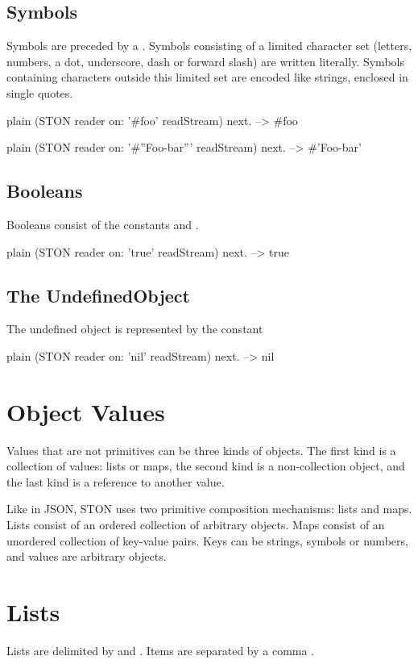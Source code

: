\documentclass[10pt,twoside,english]{_support/latex/sbabook/sbabook}
\begin{document}
\subsection{Symbols}
Symbols are preceded by a \textcode{\#}.
Symbols consisting of a limited character set (letters, numbers, a dot, underscore, dash or forward slash) are written literally. Symbols containing characters
outside this limited set are encoded like strings, enclosed in single quotes.

\begin{displaycode}{plain}
(STON reader on: '#foo' readStream) next.
   --> #foo
\end{displaycode}

\begin{displaycode}{plain}
(STON reader on: '#''Foo-bar''' readStream) next.
   --> #'Foo-bar'
\end{displaycode}
\subsection{Booleans}
Booleans consist of the constants  and .

\begin{displaycode}{plain}
(STON reader on: 'true' readStream) next.
   --> true
\end{displaycode}
\subsection{The UndefinedObject}
The undefined object is represented by the constant 

\begin{displaycode}{plain}
(STON reader on: 'nil' readStream) next.
   --> nil
\end{displaycode}
\section{Object Values}
Values that are not primitives can be three kinds of objects. The first kind is a collection of values: lists or maps, the second kind is a non-collection
object, and the last kind is a reference to another value.

Like in JSON, STON uses two primitive composition mechanisms: lists and maps.
Lists consist of an ordered collection of arbitrary objects.
Maps consist of an unordered collection of key-value pairs.
Keys can be strings, symbols or numbers, and values are arbitrary objects.
\section{Lists}
Lists are delimited by \textcode{{[}} and \textcode{{]}}. Items are separated by a comma \textcode{,}.
\end{document}
